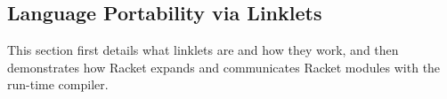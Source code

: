 \subsection{Language Portability via Linklets}
\label{subsec:linklets}

This section first details what linklets are and how they work, and
then demonstrates how Racket expands and communicates Racket modules
with the run-time compiler.



